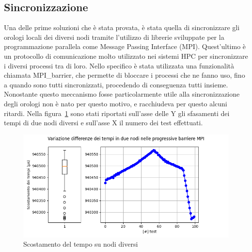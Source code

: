 \subsection{Sincronizzazione}\label{sec:timesync}
Una delle prime soluzioni che è stata provata, è stata quella di sincronizzare gli orologi locali dei diversi nodi tramite l'utilizzo di librerie sviluppate per la programmazione parallela come Message Passing Interface (MPI). Quest'ultimo è un protocollo di comunicazione molto utilizzato nei sistemi HPC per sincronizzare i diversi processi tra di loro.
Nello specifico è stata utilizzata una funzionalità chiamata MPI\_barrier, che permette di bloccare i processi che ne fanno uso,
fino a quando sono tutti sincronizzati, procedendo di conseguenza tutti insieme. Nonostante questo meccanismo fosse particolarmente utile alla sincronizzazione degli orologi non è nato per questo motivo, e racchiudeva per questo alcuni ritardi. Nella figura~\ref{fig:sync_time_shift1} sono stati riportati sull'asse delle Y gli sfasamenti dei tempi di due nodi diversi e sull'asse X il numero dei test effettuati.

\begin{figure}[H]
    \centering
    \includegraphics[width=\textwidth]{./results/time_sync_node.png}
    \caption{Scostamento del tempo su nodi diversi}\label{fig:sync_time_shift1}
\end{figure}

